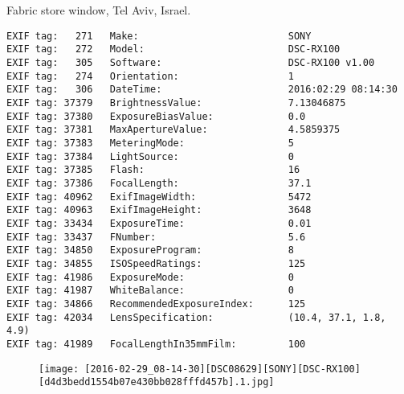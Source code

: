 \section{\protect{}}
\noindent Fabric store window, Tel Aviv, Israel.
\noindent
\begin{lstlisting}
EXIF tag:   271   Make:                          SONY
EXIF tag:   272   Model:                         DSC-RX100
EXIF tag:   305   Software:                      DSC-RX100 v1.00
EXIF tag:   274   Orientation:                   1
EXIF tag:   306   DateTime:                      2016:02:29 08:14:30
EXIF tag: 37379   BrightnessValue:               7.13046875
EXIF tag: 37380   ExposureBiasValue:             0.0
EXIF tag: 37381   MaxApertureValue:              4.5859375
EXIF tag: 37383   MeteringMode:                  5
EXIF tag: 37384   LightSource:                   0
EXIF tag: 37385   Flash:                         16
EXIF tag: 37386   FocalLength:                   37.1
EXIF tag: 40962   ExifImageWidth:                5472
EXIF tag: 40963   ExifImageHeight:               3648
EXIF tag: 33434   ExposureTime:                  0.01
EXIF tag: 33437   FNumber:                       5.6
EXIF tag: 34850   ExposureProgram:               8
EXIF tag: 34855   ISOSpeedRatings:               125
EXIF tag: 41986   ExposureMode:                  0
EXIF tag: 41987   WhiteBalance:                  0
EXIF tag: 34866   RecommendedExposureIndex:      125
EXIF tag: 42034   LensSpecification:             (10.4, 37.1, 1.8, 4.9)
EXIF tag: 41989   FocalLengthIn35mmFilm:         100

\end{lstlisting}
\clearpage
\begin{figure}
\raggedleft
\texttt{[image: [2016-02-29\_08-14-30][DSC08629][SONY][DSC-RX100][d4d3bedd1554b07e430bb028fffd457b].1.jpg]}
\end{figure}


\clearpage
